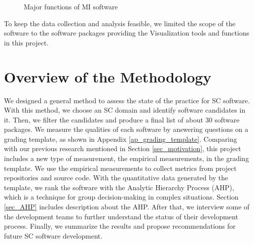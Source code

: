 \begin{figure}[h]
\centering
{}
\caption{Major functions of MI software}
\label{fig_mi_functions}
\end{figure}

To keep the data collection and analysis feasible, we limited the scope of the software to the software packages providing the Visualization tools and functions in this project.

\section{Overview of the Methodology}
We designed a general method to assess the state of the practice for SC software. With this method, we choose an SC domain and identify software candidates in it. Then, we filter the candidates and produce a final list of about 30 software packages. We measure the qualities of each software by answering questions on a grading template, as shown in Appendix \ref{ap_grading_template}. Comparing with our previous research mentioned in Section \ref{sec_motivation}, this project includes a new type of measurement, the empirical measurements, in the grading template. We use the empirical measurements to collect metrics from project repositories and source code. With the quantitative data generated by the template, we rank the software with the Analytic Hierarchy Process (AHP), which is a technique for group decision-making in complex situations. Section \ref{sec_AHP} includes description about the AHP. After that, we interview some of the development teams to further understand the status of their development process. Finally, we summarize the results and propose recommendations for future SC software development.

